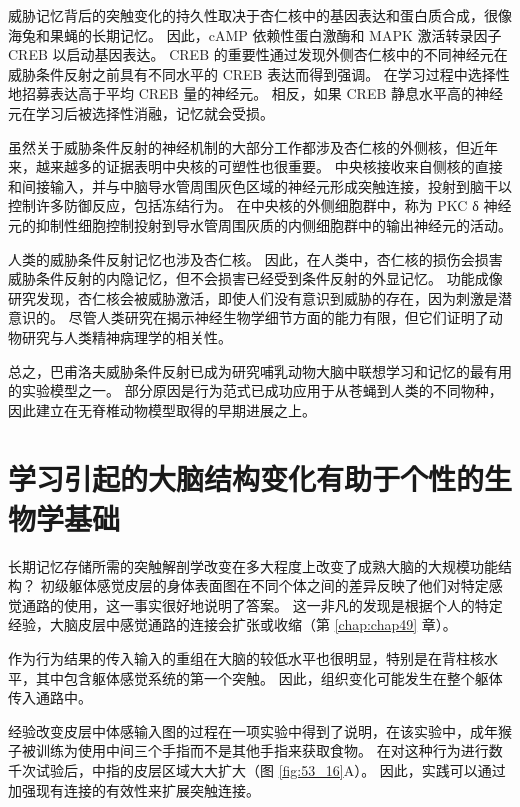 威胁记忆背后的突触变化的持久性取决于杏仁核中的基因表达和蛋白质合成，很像海兔和果蝇的长期记忆。
因此，cAMP 依赖性蛋白激酶和 MAPK 激活转录因子 CREB 以启动基因表达。
CREB 的重要性通过发现外侧杏仁核中的不同神经元在威胁条件反射之前具有不同水平的 CREB 表达而得到强调。
在学习过程中选择性地招募表达高于平均 CREB 量的神经元。
相反，如果 CREB 静息水平高的神经元在学习后被选择性消融，记忆就会受损。


虽然关于威胁条件反射的神经机制的大部分工作都涉及杏仁核的外侧核，但近年来，越来越多的证据表明中央核的可塑性也很重要。
中央核接收来自侧核的直接和间接输入，并与中脑导水管周围灰色区域的神经元形成突触连接，投射到脑干以控制许多防御反应，包括冻结行为。
在中央核的外侧细胞群中，称为 PKC δ 神经元的抑制性细胞控制投射到导水管周围灰质的内侧细胞群中的输出神经元的活动。


人类的威胁条件反射记忆也涉及杏仁核。
因此，在人类中，杏仁核的损伤会损害威胁条件反射的内隐记忆，但不会损害已经受到条件反射的外显记忆。
功能成像研究发现，杏仁核会被威胁激活，即使人们没有意识到威胁的存在，因为刺激是潜意识的。
尽管人类研究在揭示神经生物学细节方面的能力有限，但它们证明了动物研究与人类精神病理学的相关性。


总之，巴甫洛夫威胁条件反射已成为研究哺乳动物大脑中联想学习和记忆的最有用的实验模型之一。
部分原因是行为范式已成功应用于从苍蝇到人类的不同物种，因此建立在无脊椎动物模型取得的早期进展之上。



\section{学习引起的大脑结构变化有助于个性的生物学基础}

长期记忆存储所需的突触解剖学改变在多大程度上改变了成熟大脑的大规模功能结构？
初级躯体感觉皮层的身体表面图在不同个体之间的差异反映了他们对特定感觉通路的使用，这一事实很好地说明了答案。
这一非凡的发现是根据个人的特定经验，大脑皮层中感觉通路的连接会扩张或收缩（第 \ref{chap:chap49} 章）。


作为行为结果的传入输入的重组在大脑的较低水平也很明显，特别是在背柱核水平，其中包含躯体感觉系统的第一个突触。
因此，组织变化可能发生在整个躯体传入通路中。


经验改变皮层中体感输入图的过程在一项实验中得到了说明，在该实验中，成年猴子被训练为使用中间三个手指而不是其他手指来获取食物。
在对这种行为进行数千次试验后，中指的皮层区域大大扩大（图 \ref{fig:53_16}A）。
因此，实践可以通过加强现有连接的有效性来扩展突触连接。


